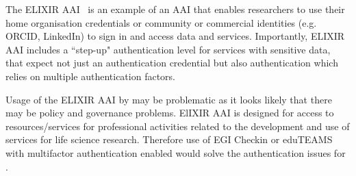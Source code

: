 \documentclass[12pt,a4paper]{article}
\begin{document}
The ELIXIR AAI~\cite{elixir-aai} is an example of an AAI that enables researchers to use their home organisation credentials or community or commercial identities (e.g. ORCID, LinkedIn) to sign in and access data and services.
Importantly, ELIXIR AAI includes a ``step-up" authentication level for services with sensitive data, that expect not just an authentication credential but also authentication which relies on multiple authentication factors.

Usage of the ELIXIR AAI by \ED may be problematic as it looks likely that there may be policy and governance problems.
ElIXIR AAI is designed for access to resources/services for professional activities related to the development and use of services for life science research.
Therefore use of EGI Checkin or eduTEAMS with multifactor authentication enabled would solve the authentication issues for \ED.



% 



\newpage
{}

\end{document}
